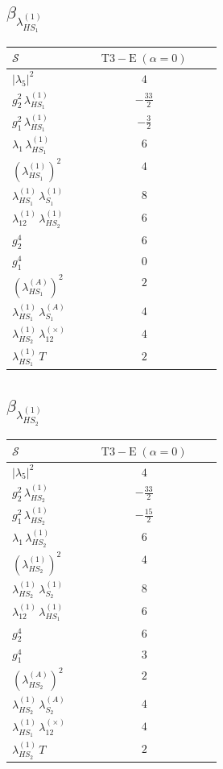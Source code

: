 \documentclass[9pt]{article}
\begin{document}
\subsection*{$ \beta_{\lambda_{HS_1}^{(1)}} $}
\begin{longtable}{@{}p{0.31\linewidth}c@{}}
\toprule
$\mathcal{S}$ & $ \mathrm{T3-E}\;(\alpha=0) $ \\
\midrule
$ |\lambda_5|^2 $ & $ 4 $ \\
$ g_2^2\,\lambda_{HS_1}^{(1)} $ & $ - \frac{33}{2} $ \\
$ g_1^2\,\lambda_{HS_1}^{(1)} $ & $ - \frac{3}{2} $ \\
$ \lambda_1\,\lambda_{HS_1}^{(1)} $ & $ 6 $ \\
$ \left(\lambda_{HS_1}^{(1)}\right)^2 $ & $ 4 $ \\
$ \lambda_{HS_1}^{(1)}\,\lambda_{S_1}^{(1)} $ & $ 8 $ \\
$ \lambda_{12}^{(1)}\,\lambda_{HS_2}^{(1)} $ & $ 6 $ \\
$ g_2^4 $ & $ 6 $ \\
$ g_1^4 $ & $ 0 $ \\
$ \left(\lambda_{HS_1}^{(A)}\right)^2 $ & $ 2 $ \\
$ \lambda_{HS_1}^{(1)}\,\lambda_{S_1}^{(A)} $ & $ 4 $ \\
$ \lambda_{HS_2}^{(1)}\,\lambda_{12}^{(\times)} $ & $ 4 $ \\
$ \lambda_{HS_1}^{(1)}\,T $ & $ 2 $ \\
\bottomrule
\end{longtable}
\subsection*{$ \beta_{\lambda_{HS_2}^{(1)}} $}
\begin{longtable}{@{}p{0.31\linewidth}c@{}}
\toprule
$\mathcal{S}$ & $ \mathrm{T3-E}\;(\alpha=0) $ \\
\midrule
$ |\lambda_5|^2 $ & $ 4 $ \\
$ g_2^2\,\lambda_{HS_2}^{(1)} $ & $ - \frac{33}{2} $ \\
$ g_1^2\,\lambda_{HS_2}^{(1)} $ & $ - \frac{15}{2} $ \\
$ \lambda_1\,\lambda_{HS_2}^{(1)} $ & $ 6 $ \\
$ \left(\lambda_{HS_2}^{(1)}\right)^2 $ & $ 4 $ \\
$ \lambda_{HS_2}^{(1)}\,\lambda_{S_2}^{(1)} $ & $ 8 $ \\
$ \lambda_{12}^{(1)}\,\lambda_{HS_1}^{(1)} $ & $ 6 $ \\
$ g_2^4 $ & $ 6 $ \\
$ g_1^4 $ & $ 3 $ \\
$ \left(\lambda_{HS_2}^{(A)}\right)^2 $ & $ 2 $ \\
$ \lambda_{HS_2}^{(1)}\,\lambda_{S_2}^{(A)} $ & $ 4 $ \\
$ \lambda_{HS_1}^{(1)}\,\lambda_{12}^{(\times)} $ & $ 4 $ \\
$ \lambda_{HS_2}^{(1)}\,T $ & $ 2 $ \\
\bottomrule
\end{longtable}
\end{document}
